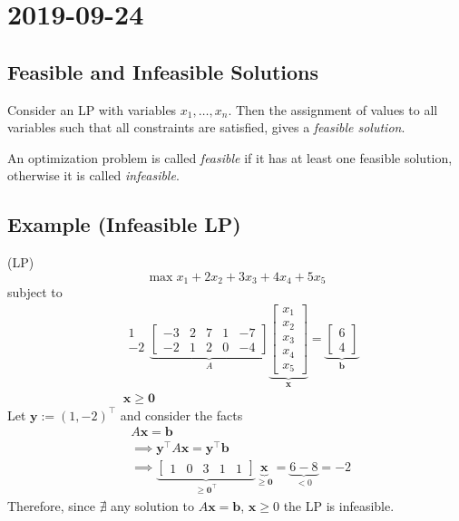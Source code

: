 \section{2019-09-24}
\begin{defbox}
    \subsection{Feasible and Infeasible Solutions}
    Consider an LP with variables $x_1,\dots,x_n$.  Then the
    assignment of values to all variables such that all constraints are satisfied,
    gives a \emph{feasible solution}.

    An optimization problem is called \emph{feasible} if it has at least one feasible
    solution, otherwise it is called \emph{infeasible}.
\end{defbox}

\subsection{Example (Infeasible LP)}
(LP)
\[\max x_1+2x_2+3x_3+4x_4+5x_5\]
subject to
\begin{align*}
    &
    \begin{matrix}
    1\\
    -2
    \end{matrix}
    \underbrace{
        \begin{bmatrix}
        -3 & 2 & 7 & 1 & -7 \\
        -2 & 1 & 2 & 0 & -4
        \end{bmatrix}}_{A}
    \underbrace{\begin{bmatrix}
        x_1\\
        x_2\\
        x_3\\
        x_4\\
        x_5
    \end{bmatrix}}_{\bm{x}}
    =
    \underbrace{\begin{bmatrix}
        6\\
        4
    \end{bmatrix}}_{\bm{b}}\\
    &\bm{x}\ge \bm{0}
\end{align*}
Let $\bm{y}:=(1,-2)^\top$
and consider the facts
\begin{align*}
    &A\bm{x}=\bm{b}\\
    &\implies \bm{y}^\top A\bm{x}=\bm{y}^\top \bm{b}\\
    &\implies \underbrace{\begin{bmatrix}
        1 & 0 & 3 & 1 & 1
    \end{bmatrix}}_{\ge \bm{0}^\top }
    \underbrace{\bm{x}}_{\ge \bm{0}}=\underbrace{6-8}_{< 0}=-2
\end{align*}
Therefore, since $\nexists$ any solution to $A\bm{x}=\bm{b}$, $\bm{x}\ge 0$
the LP is infeasible.



